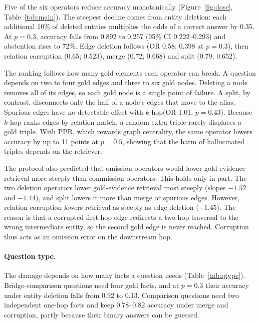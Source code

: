 \documentclass[11pt]{article}
\newcommand{\khop}{$k$-hop\xspace}
\begin{document}
Five of the six operators reduce accuracy monotonically (Figure~\ref{fig:dose}, Table~\ref{tab:main}). The steepest decline comes from entity deletion: each additional 10\% of deleted entities multiplies the odds of a correct answer by 0.35. At $p=0.3$, accuracy falls from 0.892 to 0.257 (95\% CI 0.222--0.293) and abstention rises to 72\%. Edge deletion follows (OR 0.58; 0.398 at $p=0.3$), then relation corruption (0.65; 0.523), merge (0.72; 0.668) and split (0.79; 0.652).

The ranking follows how many gold elements each operator can break. A question depends on two to four gold edges and three to six gold nodes. Deleting a node removes all of its edges, so each gold node is a single point of failure. A split, by contrast, disconnects only the half of a node's edges that move to the alias. Spurious edges have no detectable effect with \khop (OR 1.01, $p=0.43$). Because \khop ranks edges by relation match, a random extra triple rarely displaces a gold triple. With PPR, which rewards graph centrality, the same operator lowers accuracy by up to 11 points at $p=0.5$, showing that the harm of hallucinated triples depends on the retriever.

The protocol also predicted that omission operators would lower gold-evidence retrieval more steeply than commission operators. This holds only in part. The two deletion operators lower gold-evidence retrieval most steeply (slopes $-1.52$ and $-1.44$), and split lowers it more than merge or spurious edges. However, relation corruption lowers retrieval as steeply as edge deletion ($-1.45$). The reason is that a corrupted first-hop edge redirects a two-hop traversal to the wrong intermediate entity, so the second gold edge is never reached. Corruption thus acts as an omission error on the downstream hop.

\paragraph{Question type.} The damage depends on how many facts a question needs (Table~\ref{tab:qtype}). Bridge-comparison questions need four gold facts, and at $p=0.3$ their accuracy under entity deletion falls from 0.92 to 0.13. Comparison questions need two independent one-hop facts and keep 0.78--0.82 accuracy under merge and corruption, partly because their binary answers can be guessed.
\end{document}
